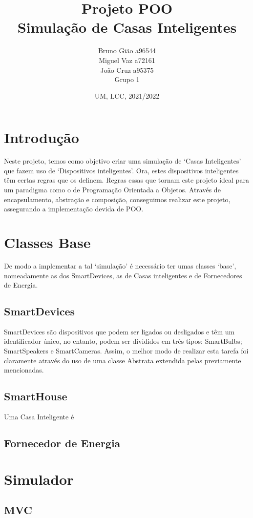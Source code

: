 \documentclass[10pt, a4paper]{article}
\title{Projeto POO\\
        Simulação de Casas Inteligentes}
\author{Bruno Gião a96544 \\ Miguel Vaz a72161 \\ João Cruz a95375 \\ Grupo 1}
\date{UM, LCC, 2021/2022}
\begin{document}
\maketitle

\newpage
\tableofcontents
\newpage

\section{Introdução}
        Neste projeto, temos como objetivo criar uma simulação de `Casas Inteligentes' que fazem uso de `Dispositivos inteligentes'.
        Ora, estes dispositivos inteligentes têm certas regras que os definem. Regras essas que tornam este projeto ideal para um paradigma como
        o de Programação Orientada a Objetos.
        Através de encapsulamento, abstração e composição, conseguimos realizar este projeto, assegurando a implementação devida de POO.\@
\section{Classes Base}
        De modo a implementar a tal `simulação' é necessário ter umas classes `base', nomeadamente as dos SmartDevices, as de Casas inteligentes e
        de Fornecedores de Energia.
\subsection{SmartDevices}
        SmartDevices são dispositivos que podem ser ligados ou desligados e têm um identificador único, no entanto, podem ser divididos em três tipos:
        SmartBulbs; SmartSpeakers e SmartCameras.
        Assim, o melhor modo de realizar esta tarefa foi claramente através do uso de uma classe Abstrata extendida pelas previamente mencionadas.
\subsection{SmartHouse}
        Uma Casa Inteligente é 
\subsection{Fornecedor de Energia}
\lipsum[1]
\section{Simulador}
\lipsum[1]
\subsection{MVC}
\lipsum[1]
\end{document}
